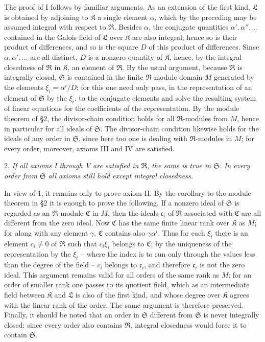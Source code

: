 \documentclass[11pt]{article}
\providecommand{\mR}{\mathfrak{R}}
\providecommand{\mK}{\mathfrak{K}}
\providecommand{\mL}{\mathfrak{L}}
\providecommand{\mS}{\mathfrak{S}}
\providecommand{\mC}{\mathfrak{C}}
\providecommand{\mc}{\mathfrak{c}}
\begin{document}
The proof of I follows by familiar arguments. As an extension of the first kind, $\mL$ is obtained by adjoining to $\mK$ a single element $\alpha$, which by the preceding may be assumed integral with respect to $\mR$. Besides $\alpha$, the conjugate quantities $\alpha',\alpha'',\ldots$ contained in the Galois field of $\mL$ over $\mK$ are also integral; hence so is their product of differences, and so is the square $D$ of this product of differences. Since $\alpha,\alpha',\ldots$ are all distinct, $D$ is a nonzero quantity of $\mK$, hence, by the integral closedness of $\mR$ in $\mK$, an element of $\mR$. By the usual argument, because $\mR$ is integrally closed, $\mS$ is contained in the finite $\mR$-module domain $M$ generated by the elements $\xi_i=\alpha^i/D$; for this one need only pass, in the representation of an element of $\mS$ by the $\xi_i$, to the conjugate elements and solve the resulting system of linear equations for the coefficients of the representation. By the module theorem of §2, the divisor-chain condition holds for all $\mR$-modules from $M$, hence in particular for all ideals of $\mS$. The divisor-chain condition likewise holds for the ideals of any order in $\mS$, since here too one is dealing with $\mR$-modules in $M$; for every order, moreover, axioms III and IV are satisfied.

2. \emph{If all axioms I through V are satisfied in $\mR$, the same is true in $\mS$. In every order from $\mS$ all axioms still hold except integral closedness.}

In view of 1, it remains only to prove axiom II. By the corollary to the module theorem in §2 it is enough to prove the following. If a nonzero ideal of $\mS$ is regarded as an $\mR$-module $\mC$ in $M$, then the ideals $\mc_i$ of $\mR$ associated with $\mC$ are all different from the zero ideal. Now $\mC$ has the same finite linear rank over $\mK$ as $M$; for along with any element $\gamma$, $\mC$ contains also $\gamma\alpha^i$. Thus for each $\xi_i$ there is an element $c_i\ne0$ of $\mR$ such that $c_i\xi_i$ belongs to $\mC$; by the uniqueness of the representation by the $\xi_i$ -- where the index is to run only through the values less than the degree of the field -- $c_i$ belongs to $\mc_i$, and therefore $\mc_i$ is not the zero ideal. This argument remains valid for all orders of the same rank as $M$; for an order of smaller rank one passes to its quotient field, which as an intermediate field between $\mK$ and $\mL$ is also of the first kind, and whose degree over $\mK$ agrees with the linear rank of the order. The same argument is therefore preserved. Finally, it should be noted that an order in $\mS$ different from $\mS$ is never integrally closed: since every order also contains $\mR$, integral closedness would force it to contain $\mS$.
\end{document}
